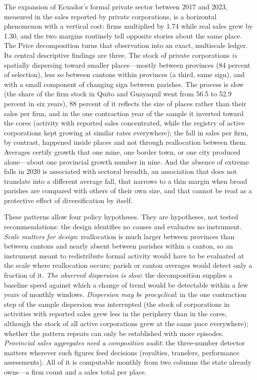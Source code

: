 \documentclass[conference]{IEEEtran}
\begin{document}
The expansion of Ecuador's formal private sector between 2017 and 2023,
measured in the sales reported by private corporations, is a horizontal phenomenon with a vertical cost:
firms multiplied by 1.74 while real sales grew by 1.30, and the two
margins routinely tell opposite stories about the same place. The Price
decomposition turns that observation into an exact, multiscale ledger.
Its central descriptive findings are three. The stock of private
corporations \textit{is} spatially dispersing toward smaller
places---mostly between provinces (84 percent of selection), less so
between cantons within provinces (a third, same sign), and with a small
component of changing sign between parishes. The process is slow (the
share of the firm stock in Quito and Guayaquil went from 56.5 to 52.9
percent in six years), 88 percent of it reflects the size of places
rather than their sales per firm, and in the one contraction year of the sample it inverted toward the cores
(activity with reported sales concentrated, while the registry of active
corporations kept growing at similar rates everywhere); the fall in sales per firm, by
contrast, happened inside places and not through reallocation between
them. Averages certify growth that one mine, one border town, or one city
produced alone---about one provincial growth number in nine. And the
absence of extreme falls in 2020 is associated with sectoral breadth, an
association that does not translate into a different average fall, that
narrows to a thin margin when broad parishes are compared with others of
their own size, and that cannot be read as a protective effect of
diversification by itself.

These patterns allow four policy hypotheses. They are hypotheses, not
tested recommendations: the design identifies no causes and evaluates no
instrument. \textit{Scale matters for design}: reallocation is much
larger between provinces than between cantons and nearly absent between
parishes within a canton, so an instrument meant to redistribute formal
activity would have to be evaluated at the scale where reallocation
occurs; parish or canton averages would detect only a fraction of it.
\textit{The observed dispersion is slow}: the decomposition supplies a
baseline speed against which a change of trend would be detectable
within a few years of monthly windows. \textit{Dispersion may be
procyclical}: in the one contraction step of the sample dispersion was
interrupted (the stock of corporations in activities with reported sales
grew less in the periphery than in the cores, although the stock of all
active corporations grew
at the same pace everywhere); whether the pattern repeats
can only be established with more episodes. \textit{Provincial sales
aggregates need a composition audit}: the three-number detector matters
wherever such figures feed decisions (royalties, transfers, performance
assessments). All of it is computable monthly from two columns the state
already owns---a firm count and a sales total per place.
\end{document}

